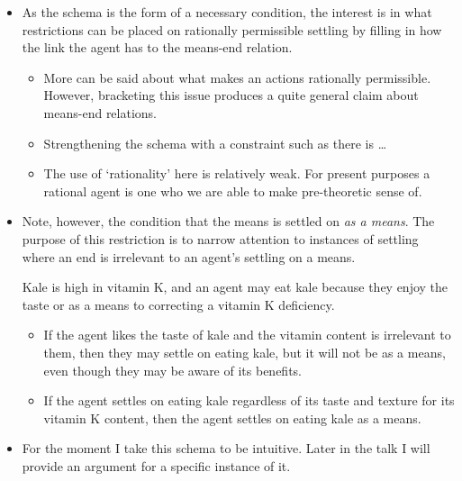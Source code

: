 \documentclass[10pt]{article}
\newcommand{\hand}{\ding{43}}
\begin{document}
\begin{itemize}
\item[\hand] As the schema is the form of a necessary condition, the interest is in what restrictions can be placed on rationally permissible settling by filling in how the link the agent has to the means-end relation.
  \begin{itemize}
  \item More can be said about what makes an actions rationally permissible.
    However, bracketing this issue produces a quite general claim about means-end relations.
  \item {\color{red} Strengthening the schema with a constraint such as there is \dots}
  \item The use of `rationality' here is relatively weak.
    For present purposes a rational agent is one who we are able to make pre-theoretic sense of.
  \end{itemize}
\item Note, however, the condition that the means is settled on \emph{as a means}.
  The purpose of this restriction is to narrow attention to instances of settling where an end is irrelevant to an agent's settling on a means.
  \begin{example}
    Kale is high in vitamin K, and an agent may eat kale because they enjoy the taste or as a means to correcting a vitamin K deficiency.
    \begin{itemize}
    \item If the agent likes the taste of kale and the vitamin content is irrelevant to them, then they may settle on eating kale, but it will not be as a means, even though they may be aware of its benefits.
    \item If the agent settles on eating kale regardless of its taste and texture for its vitamin K content, then the agent settles on eating kale as a means.
    \end{itemize}
  \end{example}
\end{itemize}


\begin{itemize}
\item For the moment I take this schema to be intuitive.
  Later in the talk I will provide an argument for a specific instance of it.
\end{itemize}
\end{document}
